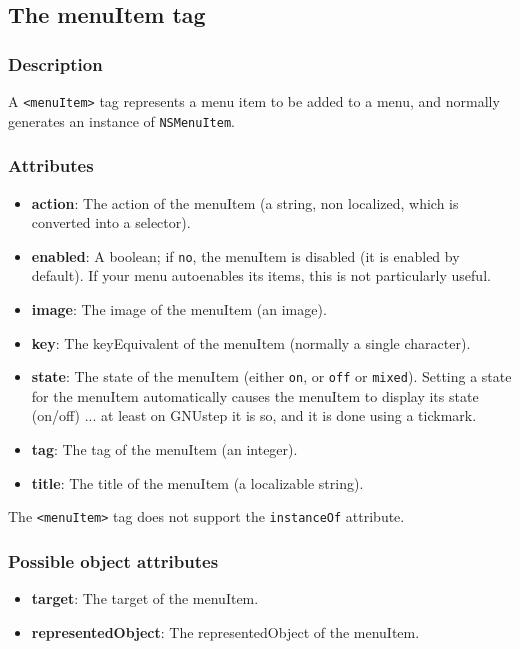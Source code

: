 \subsection{The menuItem tag}

\subsubsection{Description}
A \texttt{<menuItem>} tag represents a menu item to be added to a menu,
and normally generates an instance of \texttt{NSMenuItem}.

\subsubsection{Attributes}
\begin{itemize}
\item {\bf action}: The action of the menuItem (a string, non
  localized, which is converted into a selector).
\item {\bf enabled}: A boolean; if \texttt{no}, the menuItem is
  disabled (it is enabled by default).  If your menu autoenables its
  items, this is not particularly useful.
\item {\bf image}: The image of the menuItem (an image).
\item {\bf key}: The keyEquivalent of the menuItem (normally a single
  character).
\item {\bf state}: The state of the menuItem (either \texttt{on}, or
  \texttt{off} or \texttt{mixed}).  Setting a state for the menuItem
  automatically causes the menuItem to display its state (on/off)
  ... at least on GNUstep it is so, and it is done using a tickmark.
\item {\bf tag}: The tag of the menuItem (an integer).
\item {\bf title}: The title of the menuItem (a localizable string).
\end{itemize}

The \texttt{<menuItem>} tag does not support the \texttt{instanceOf} attribute.

\subsubsection{Possible object attributes}
\begin{itemize}
\item {\bf target}: The target of the menuItem.
\item {\bf representedObject}: The representedObject of the menuItem.
\end{itemize}

